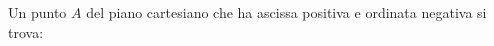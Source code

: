 Un punto \(\displaystyle A\) del piano cartesiano che ha ascissa positiva 
e ordinata negativa si trova: